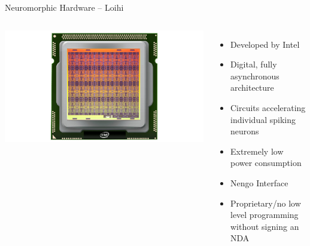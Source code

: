 \documentclass[handout,aspectratio=169]{beamer}
\begin{document}
\begin{frame}{Neuromorphic Hardware -- Loihi}
	\centering
	\begin{columns}
		\includegraphics[width=\textwidth]{media/loihi.jpg}\\
		\begin{itemize}
			\setlength{\itemsep}{0.25cm}
			\item Developed by Intel
			\item Digital, fully asynchronous architecture
			\item Circuits accelerating individual spiking neurons
			\item<2->[\OPlus] Extremely low power consumption
			\item<2->[\OPlus] Nengo Interface
			\item<2->[\OMinus] Proprietary/no low level programming without signing an NDA
		\end{itemize}
	\end{columns}
\end{frame}
\end{document}
